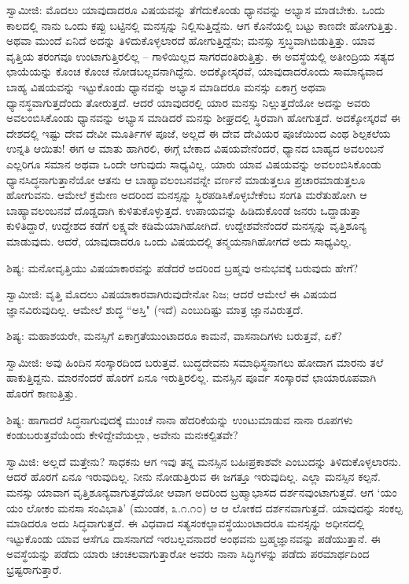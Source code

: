 ಸ್ವಾಮೀಜಿ: ಮೊದಲು ಯಾವುದಾದರೂ ವಿಷಯವನ್ನು ತೆಗೆದುಕೊಂಡು ಧ್ಯಾನವನ್ನು ಅಭ್ಯಾಸ ಮಾಡಬೇಕು. ಒಂದು ಕಾಲದಲ್ಲಿ ನಾನು ಒಂದು ಕಪ್ಪು ಬಟ್ಟಿನಲ್ಲಿ ಮನಸ್ಸನ್ನು ನಿಲ್ಲಿಸುತ್ತಿದ್ದೆನು. ಆಗ ಕೊನೆಯಲ್ಲಿ ಬಟ್ಟು ಕಾಣದೇ ಹೋಗುತ್ತಿತ್ತು. ಅಥವಾ ಮುಂದೆ ಏನಿದೆ ಅದನ್ನು ತಿಳಿದುಕೊಳ್ಳಲಾರದೆ ಹೋಗುತ್ತಿದ್ದೆನು; ಮನಸ್ಸು ಸ್ತಬ್ಧವಾಗಿಬಿಡುತ್ತಿತ್ತು. ಯಾವ ವೃತ್ತಿಯ ತರಂಗವೂ ಉಂಟಾಗುತ್ತಿರಲಿಲ್ಲ – ಗಾಳಿಯಿಲ್ಲದ ಸಾಗರದಂತಿರುತ್ತಿತ್ತು. ಈ ಅವಸ್ಥೆಯಲ್ಲಿ ಅತೀಂದ್ರಿಯ ಸತ್ಯದ ಛಾಯೆಯನ್ನು ಕೊಂಚ ಕೊಂಚ ನೋಡಬಲ್ಲವನಾಗಿದ್ದೆನು. ಅದಕ್ಕೋಸ್ಕರವೆ, ಯಾವುದಾದರೊಂದು ಸಾಮಾನ್ಯವಾದ ಬಾಹ್ಯ ವಿಷಯವನ್ನು ಇಟ್ಟುಕೊಂಡು ಧ್ಯಾನವನ್ನು ಅಭ್ಯಾಸ ಮಾಡಿದರೂ ಮನಸ್ಸು ಏಕಾಗ್ರ ಅಥವಾ ಧ್ಯಾನಸ್ಥವಾಗುತ್ತದೆಂದು ತೋರುತ್ತದೆ. ಆದರೆ ಯಾವುದರಲ್ಲಿ ಯಾರ ಮನಸ್ಸು ನಿಲ್ಲುತ್ತದೆಯೋ ಅದನ್ನು ಅವರು ಅವಲಂಬಿಸಿಕೊಂಡು ಧ್ಯಾನವನ್ನು ಅಭ್ಯಾಸ ಮಾಡಿದರೆ ಮನಸ್ಸು ಶೀಘ್ರದಲ್ಲಿ ಸ್ಥಿರವಾಗಿ ಹೋಗುತ್ತದೆ. ಅದಕ್ಕೋಸ್ಕರವೆ ಈ ದೇಶದಲ್ಲಿ ಇಷ್ಟು ದೇವ ದೇವೀ ಮೂರ್ತಿಗಳ ಪೂಜೆ, ಅಲ್ಲದೆ ಈ ದೇವ ದೇವಿಯರ ಪೂಜೆಯಿಂದ ಎಂಥ ಶಿಲ್ಪಕಲೆಯ ಉನ್ನತಿ ಆಯಿತು! ಈಗ ಆ ಮಾತು ಹಾಗಿರಲಿ, ಈಗ್ಗೆ ಬೇಕಾದ ವಿಷಯವೇನೆಂದರೆ, ಧ್ಯಾನದ ಬಾಹ್ಯದ ಅವಲಂಬನೆ ಎಲ್ಲರಿಗೂ ಸಮಾನ ಅಥವಾ ಒಂದೇ ಆಗುವುದು ಸಾಧ್ಯವಿಲ್ಲ. ಯಾರು ಯಾವ ವಿಷಯವನ್ನು ಅವಲಂಬಿಸಿಕೊಂಡು ಧ್ಯಾನಸಿದ್ಧನಾಗುತ್ತಾನೆಯೋ ಆತನು ಆ ಬಾಹ್ಯಾವಲಂಬನವನ್ನೇ ವರ್ಣನೆ ಮಾಡುತ್ತಲೂ ಪ್ರಚಾರಮಾಡುತ್ತಲೂ ಹೋಗುವನು. ಆಮೇಲೆ ಕ್ರಮೇಣ ಅದರಿಂದ ಮನಸ್ಸನ್ನು ಸ್ಥಿರಪಡಿಸಿಕೊಳ್ಳಬೇಕೆಂಬ ಸಂಗತಿ ಮರೆತುಹೋಗಿ ಆ ಬಾಹ್ಯಾವಲಂಬನವೆ ದೊಡ್ಡದಾಗಿ ಕುಳಿತುಕೊಳ್ಳುತ್ತದೆ. ಉಪಾಯವನ್ನು ಹಿಡಿದುಕೊಂಡೆ ಜನರು ಒದ್ದಾಡುತ್ತಾ ಕುಳಿತಿದ್ದಾರೆ, ಉದ್ದೇಶದ ಕಡೆಗೆ ಲಕ್ಷ್ಯವೇ ಕಡಿಮೆಯಾಗಿಹೋಗಿದೆ. ಉದ್ದೇಶವೇನೆಂದರೆ ಮನಸ್ಸನ್ನು ವೃತ್ತಿಶೂನ್ಯ ಮಾಡುವುದು. ಆದರೆ, ಯಾವುದಾದರೂ ಒಂದು ವಿಷಯದಲ್ಲಿ ತನ್ಮಯನಾಗಿಹೋಗದೆ ಅದು ಸಾಧ್ಯವಿಲ್ಲ.

ಶಿಷ್ಯ: ಮನೋವೃತ್ತಿಯು ವಿಷಯಾಕಾರವನ್ನು ಪಡೆದರೆ ಅದರಿಂದ ಬ್ರಹ್ಮವು ಅನುಭವಕ್ಕೆ ಬರುವುದು ಹೇಗೆ?

ಸ್ವಾಮೀಜಿ: ವೃತ್ತಿ ಮೊದಲು ವಿಷಯಾಕಾರವಾಗಿರುವುದೇನೋ ನಿಜ; ಆದರೆ ಆಮೇಲೆ ಈ ವಿಷಯದ ಜ್ಞಾನವಿರುವುದಿಲ್ಲ. ಆಮೇಲೆ ಶುದ್ಧ “ಅಸ್ತಿ" (ಇದೆ) ಎಂಬುದಿಷ್ಟು ಮಾತ್ರ ಜ್ಞಾನವಿರುತ್ತದೆ.

ಶಿಷ್ಯ: ಮಹಾಶಯರೇ, ಮನಸ್ಸಿಗೆ ಏಕಾಗ್ರತೆಯುಂಟಾದರೂ ಕಾಮನೆ, ವಾಸನಾದಿಗಳು ಬರುತ್ತವೆ, ಏಕೆ?

ಸ್ವಾಮೀಜಿ: ಅವು ಹಿಂದಿನ ಸಂಸ್ಕಾರದಿಂದ ಬರುತ್ತವೆ. ಬುದ್ಧದೇವನು ಸಮಾಧಿಸ್ಥನಾಗಲು ಹೋದಾಗ ಮಾರನು ತಲೆ ಹಾಕುತ್ತಿದ್ದನು. ಮಾರನೆಂದರೆ ಹೊರಗೆ ಏನೂ ಇರುತ್ತಿರಲಿಲ್ಲ. ಮನಸ್ಸಿನ ಪೂರ್ವ ಸಂಸ್ಕಾರವೆ ಛಾಯಾರೂಪವಾಗಿ ಹೊರಗೆ ಕಾಣುತ್ತಿತ್ತು.

ಶಿಷ್ಯ: ಹಾಗಾದರೆ ಸಿದ್ಧನಾಗುವುದಕ್ಕೆ ಮುಂಚೆ ನಾನಾ ಹೆದರಿಕೆಯನ್ನು ಉಂಟುಮಾಡುವ ನಾನಾ ರೂಪಗಳು ಕಂಡುಬರುತ್ತವೆಯೆಂದು ಕೇಳಿದ್ದೇವೆಯಲ್ಲಾ, ಅವೇನು ಮನಃಕಲ್ಪಿತವೇ?

ಸ್ವಾಮಿಜಿ: ಅಲ್ಲದೆ ಮತ್ತೇನು? ಸಾಧಕನು ಆಗ ಇವು ತನ್ನ ಮನಸ್ಸಿನ ಬಹಿಃಪ್ರಕಾಶವೇ ಎಂಬುದನ್ನು ತಿಳಿದುಕೊಳ್ಳಲಾರನು. ಆದರೆ ಹೊರಗೆ ಏನೂ ಇರುವುದಿಲ್ಲ. ನೀನು ನೋಡುತ್ತಿರುವ ಈ ಜಗತ್ತೂ ಇರುವುದಿಲ್ಲ. ಎಲ್ಲಾ ಮನಸ್ಸಿನ ಕಲ್ಪನೆ. ಮನಸ್ಸು ಯಾವಾಗ ವೃತ್ತಿಶೂನ್ಯವಾಗುತ್ತದೆಯೋ ಆವಾಗ ಅದರಿಂದ ಬ್ರಹ್ಮಾಭಾಸದ ದರ್ಶನವುಂಟಾಗುತ್ತದೆ. ಆಗ ‘ಯಂ ಯಂ ಲೋಕಂ ಮನಸಾ ಸಂವಿಭಾತಿ’ (ಮುಂಡಕ, ೩.೧.೧೦) ಆ ಆ ಲೋಕದ ದರ್ಶನವಾಗುತ್ತದೆ. ಯಾವುದನ್ನು ಸಂಕಲ್ಪ ಮಾಡಿದರೂ ಅದು ಸಿದ್ಧವಾಗುತ್ತದೆ. ಈ ವಿಧವಾದ ಸತ್ಯಸಂಕಲ್ಪಾವಸ್ಥೆಯುಂಟಾದರೂ ಮನಸ್ಸನ್ನು ಅಧೀನದಲ್ಲಿ ಇಟ್ಟುಕೊಂಡು ಯಾವ ಆಸೆಗೂ ದಾಸನಾಗದೆ ಇರಬಲ್ಲವನಾದರೆ ಅಂಥವನು ಬ್ರಹ್ಮಜ್ಞಾನವನ್ನು ಪಡೆಯುತ್ತಾನೆ. ಈ ಅವಸ್ಥೆಯನ್ನು ಪಡೆದು ಯಾರು ಚಂಚಲವಾಗುತ್ತಾರೋ ಅವರು ನಾನಾ ಸಿದ್ಧಿಗಳನ್ನು ಪಡೆದು ಪರಮಾರ್ಥದಿಂದ ಭ್ರಷ್ಟರಾಗುತ್ತಾರೆ.

